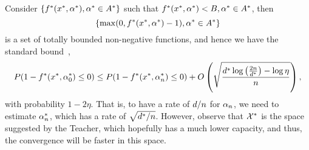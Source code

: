 Consider $\left\{f^*(x^*, \alpha^*), \alpha^* \in A^*\right\}$ such that $f^*(x^*, \alpha^*) < B, \alpha^* \in A^*$, then 
$$\left\{\max(0, f^*(x^*, \alpha^*)- 1), \alpha^* \in A^*\right\}$$
 is a set of totally bounded non-negative functions, and hence we have the standard bound~\citep{Vapnik00},
\begin{equation}
    \nonumber
    P(1 - f^*(x^*, \alpha^*_0) \leq 0) \leq P(1 - f^*(x^*, \alpha^*_n) \leq 0) + O\left( \sqrt{\frac{d^* \log\left(\frac{2n}{d^*} \right) - \log\eta}{n}}  \right) ,
\end{equation}
with probability $1 - 2\eta$.
That is, to have a rate of $d/n$ for $\alpha_n$, we need to estimate $\alpha^*_n$, which has a rate of $\sqrt{d^*/n}$. However, observe that $\mathcal{X}^*$ is the space suggested by the Teacher, which hopefully has a much lower capacity, and thus, the convergence will be faster in this space.

